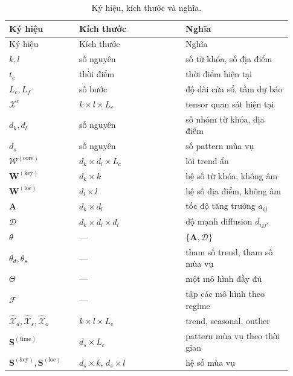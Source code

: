 \begin{longtable}{@{}>{\raggedright\arraybackslash}p{0.23\linewidth}>{\raggedright\arraybackslash}p{0.35\linewidth}>{\raggedright\arraybackslash}p{0.35\linewidth}@{}}
  \caption{Ký hiệu, kích thước và nghĩa.}\label{tab:appendix-symbols}\\
  \toprule
  Ký hiệu & Kích thước & Nghĩa \\
  \midrule
  \endfirsthead
  \toprule
  Ký hiệu & Kích thước & Nghĩa \\
  \midrule
  \endhead
  $k,l$ & số nguyên & số từ khóa, số địa điểm \\
  $t_c$ & thời điểm & thời điểm hiện tại \\
  $L_c,L_f$ & số bước & độ dài cửa sổ, tầm dự báo \\
  $\mathcal{X}^{c}$ & $k\times l\times L_c$ & tensor quan sát hiện tại \\
  $d_k,d_l$ & số nguyên & số nhóm từ khóa, địa điểm \\
  $d_s$ & số nguyên & số pattern mùa vụ \\
  $\mathcal{W}^{(\mathrm{core})}$ & $d_k\times d_l\times L_c$ & lõi trend ẩn \\
  $\mathbf{W}^{(\mathrm{key})}$ & $d_k\times k$ & hệ số từ khóa, không âm \\
  $\mathbf{W}^{(\mathrm{loc})}$ & $d_l\times l$ & hệ số địa điểm, không âm \\
  $\mathbf{A}$ & $d_k\times d_l$ & tốc độ tăng trưởng $a_{ij}$ \\
  $\mathcal{D}$ & $d_k\times d_l\times d_l$ & độ mạnh diffusion $d_{ijj'}$ \\
  $\theta$ & --- & $\{\mathbf{A},\mathcal{D}\}$ \\
  $\theta_d,\theta_s$ & --- & tham số trend, tham số mùa vụ \\
  $\Theta$ & --- & một mô hình đầy đủ \\
  $\mathcal{F}$ & --- & tập các mô hình theo regime \\
  $\widehat{\mathcal{X}}_d,\widehat{\mathcal{X}}_s,\widehat{\mathcal{X}}_o$ & $k\times l\times L_c$ & trend, seasonal, outlier \\
  $\mathbf{S}^{(\mathrm{time})}$ & $d_s\times L_c$ & pattern mùa vụ theo thời gian \\
  $\mathbf{S}^{(\mathrm{key})},\mathbf{S}^{(\mathrm{loc})}$ & $d_s\times k$, $d_s\times l$ & hệ số mùa vụ \\
  \bottomrule
\end{longtable}

